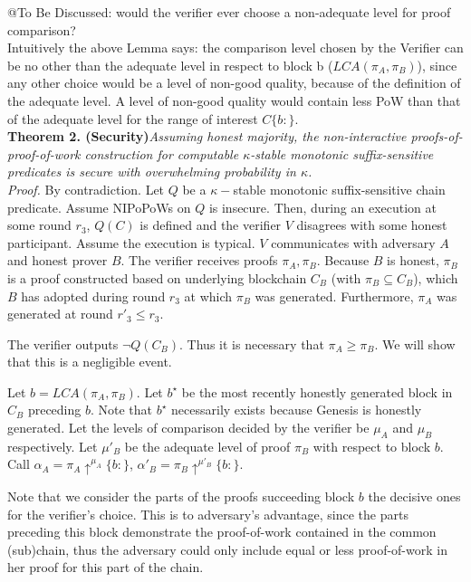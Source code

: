 @To Be Discussed: would the verifier ever choose a non-adequate level for proof comparison? \\
Intuitively the above Lemma says: the comparison level chosen by the Verifier can be
no other than the adequate level in respect to block b ($LCA(\pi_A, \pi_B)$), since
any other choice would be a level of non-good quality, because of the definition of
the adequate level. A level of non-good quality would contain less PoW than that of
the adequate level for the range of interest $C\{b:\}$. \\


\textbf{Theorem 2. (Security)}\textit{Assuming honest majority, the non-interactive
proofs-of-proof-of-work construction for computable $\kappa$-stable monotonic
suffix-sensitive predicates is secure with overwhelming probability in $\kappa$.}\\

\textit{Proof.} By contradiction. Let $Q$ be a $\kappa-$stable monotonic
suffix-sensitive chain predicate. Assume NIPoPoWs on $Q$ is insecure. Then,
during an execution at some round  $r_3$, $Q(C)$ is defined and the verifier
$V$ disagrees with some honest participant. Assume the execution is typical.
$V$ communicates with adversary $A$ and honest prover $B$. The verifier receives
proofs $\pi_A, \pi_B$. Because $B$ is honest, $\pi_B$ is a proof constructed
based on underlying blockchain $C_B$ (with $\pi_B \subseteq C_B$), which $B$
has adopted during round $r_3$ at which $\pi_B$ was generated. Furthermore,
$\pi_A$ was generated at round $r'_3 \leq r_3$.

The verifier outputs $\neg Q(C_B)$. Thus it is necessary that $\pi_A \geq 
\pi_B$. We will show that this is a negligible event.

Let $b = LCA(\pi_A, \pi_B)$. Let $b^\star$ be the most recently honestly
generated block in $C_B$ preceding $b$. Note that $b^\star$ necessarily
exists because Genesis is honestly generated. Let the levels of comparison
decided by the verifier be $\mu_A$ and $\mu_B$ respectively. Let $\mu'_B$
be the adequate level of proof $\pi_B$  with respect to block $b$. Call
$\alpha_A = \pi_A \uparrow^{\mu_A}\{b:\}$,
$\alpha'_B = \pi_B \uparrow^{\mu'_B}\{b:\}$.

Note that we consider the parts of the proofs succeeding block $b$ the decisive ones 
for the verifier's choice. This is to adversary's advantage, since the parts 
preceding this block demonstrate the proof-of-work contained in the common 
(sub)chain, thus the adversary could only include equal or less proof-of-work
in her proof for this part of the chain.


